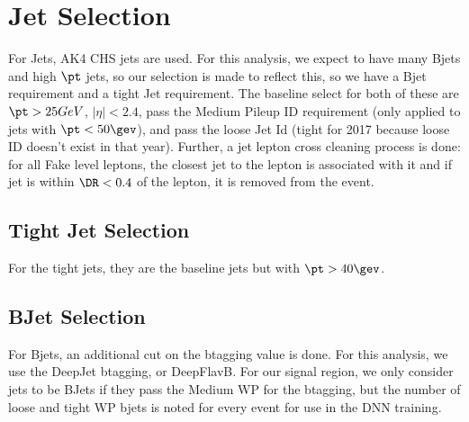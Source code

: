 \section{Jet Selection}\label{sec:jet-selection}
For Jets, AK4 CHS jets are used. For this analysis, we expect to have many Bjets and high $\pt$ jets, so our selection is made to reflect this, so we have a Bjet requirement and a tight Jet requirement. The baseline select for both of these are $\pt > 25 GeV$, $|\eta|<2.4$, pass the Medium Pileup ID requirement (only applied to jets with $\pt < 50\gev$), and pass the loose Jet Id (tight for 2017 because loose ID doesn't exist in that year). Further, a jet lepton cross cleaning process is done: for all Fake level leptons, the closest jet to the lepton is associated with it and if jet is within $\DR < 0.4$ of the lepton, it is removed from the event.

\subsection{Tight Jet Selection}\label{sec:bjet-selection}
For the tight jets, they are the baseline jets but with $\pt > 40\gev$.


\subsection{BJet Selection}\label{sec:bjet-selection}
For Bjets, an additional cut on the btagging value is done. For this analysis, we use the DeepJet btagging, or DeepFlavB. For our signal region, we only consider jets to be BJets if they pass the Medium WP for the btagging, but the number of loose and tight WP bjets is noted for every event for use in the DNN training.




% 


